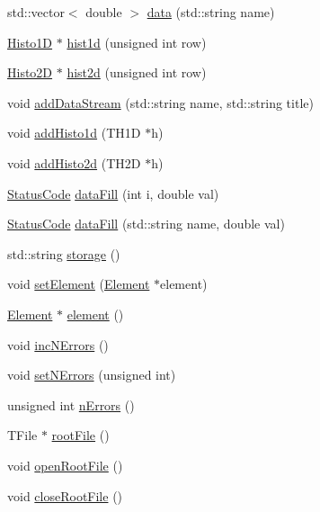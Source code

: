 \begin{DoxyCompactItemize}
\item 
std::vector$<$ double $>$ \hyperlink{classProcessus_abf4d91fb36707e1d50178bab12d21ae9}{data} (std::string name)
\item 
\hyperlink{classHisto1D}{Histo1D} $\ast$ \hyperlink{classProcessus_a409227db936baff03c0462c1bcfe8069}{hist1d} (unsigned int row)
\item 
\hyperlink{classHisto2D}{Histo2D} $\ast$ \hyperlink{classProcessus_a73b5118cb5f2b5eaad33286183b86cfc}{hist2d} (unsigned int row)
\item 
void \hyperlink{classProcessus_a308c8f193802f1d1ab49d4447d0cb281}{addDataStream} (std::string name, std::string title)
\item 
void \hyperlink{classProcessus_ad46e0d4dfdfdcbce001ee6be1746dfa4}{addHisto1d} (TH1D $\ast$h)
\item 
void \hyperlink{classProcessus_ac1ed1aed5edaeabdf18aa56775440471}{addHisto2d} (TH2D $\ast$h)
\item 
\hyperlink{classStatusCode}{StatusCode} \hyperlink{classProcessus_a0d093b48f3218a088ba030e24372f18c}{dataFill} (int i, double val)
\item 
\hyperlink{classStatusCode}{StatusCode} \hyperlink{classProcessus_aa31ab71711f7af6a729441ff573f69c9}{dataFill} (std::string name, double val)
\item 
std::string \hyperlink{classProcessus_a33fa1a0b54a636e5cdd680669fd9ea51}{storage} ()
\item 
void \hyperlink{classProcessus_a8ddef94227d83d9dae2cd49aebc33353}{setElement} (\hyperlink{classElement}{Element} $\ast$element)
\item 
\hyperlink{classElement}{Element} $\ast$ \hyperlink{classProcessus_a6fe155527431a7190b7d44d600b9608d}{element} ()
\item 
void \hyperlink{classProcessus_abe603d0636f76db6aa6c5c60cf34c591}{incNErrors} ()
\item 
void \hyperlink{classProcessus_a831b027b9cf18ab56fa6147b5d3055da}{setNErrors} (unsigned int)
\item 
unsigned int \hyperlink{classProcessus_a82a0487f82f07cc2c2dc2731f98149e7}{nErrors} ()
\item 
TFile $\ast$ \hyperlink{classProcessus_a247e8c362ec08422cf53d08dd23b093c}{rootFile} ()
\item 
void \hyperlink{classProcessus_aacf6812880c1d1a2bf14a4a39458f443}{openRootFile} ()
\item 
void \hyperlink{classProcessus_a2f3c41e99da4c738ea3d8f7b0d20a665}{closeRootFile} ()
\item 

\end{DoxyCompactItemize}
